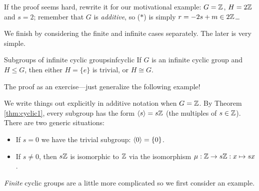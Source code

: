 If the proof seems hard, rewrite it for our motivational example: $G=\mathbb{Z}$, $H=2\mathbb{Z}$ and $s=2$; remember that $G$ is \emph{additive}, so ($\ast$) is simply $r=-2s+m\in 2\mathbb{Z}$\ldots


\goodbreak

We finish by considering the finite and infinite cases separately. The later is very simple.

\begin{cor}{Subgroups of infinite cyclic groups}{infcyclic}
	If $G$ is an infinite cyclic group and $H\le G$, then either $H=\{e\}$ is trivial, or $H\cong G$.
\end{cor}

The proof as an exercise---just generalize the following example!

\begin{example}{}{}
	We write things out explicitly in additive notation when $G=\mathbb{Z}$. By Theorem \ref{thm:cyclic1}, every subgroup has the form $\left\langle s\right\rangle=s\mathbb{Z}$ (the multiples of $s\in\mathbb{Z}$). There are two generic situations:
	\begin{itemize}
	  \item If $s=0$ we have the trivial subgroup: $\left\langle 0\right\rangle=\{0\}$.
	  \item If $s\neq 0$, then $s\mathbb{Z}$ is isomorphic to $\mathbb{Z}$ via the isomorphism $\mu:\mathbb{Z}\to s\mathbb{Z}:x\mapsto sx$.
	\end{itemize}
\end{example}


\smallskip


\emph{Finite} cyclic groups are a little more complicated so we first consider an example.


